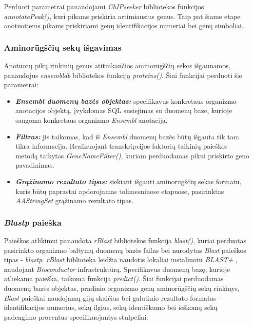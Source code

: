 \documentclass[12pt]{article}
\begin{document}
Perduoti parametrai panaudojami \emph{ChIPseeker} \cite{CHIPSEEKER} bibliotekos
funkcijos \emph{annotatePeak()}, kuri pikams priskiria artimiausius genus.
Taip pat šiame etape anotuotiems pikams priskiriami genų identifikacijos
numeriai bei genų simboliai.

\subsubsection{Aminorūgščių sekų išgavimas}
Anotuotų pikų rinkinių genus atitinkančios aminorūgščių sekos išgaunamos,
panaudojus \emph{ensembldb} \cite{ENSEMBLDB} bibliotekos funkciją 
\emph{proteins()}. Šiai funkcijai perduoti šie parametrai:

\begin{itemize}
    \item \textbf{\emph{Ensembl duomenų bazės objektas:}} specifikavus
        konkretaus organizmo anotacijos objektą, įvykdomas SQL susiejimas su
        duomenų baze, kurioje saugoma konkretaus organizmo \emph{Ensembl}
        anotacija.
    \item \textbf{\emph{Filtras:}} jis taikomas, kad iš \emph{Ensembl} duomenų
        bazės būtų išgauta tik tam tikra informacija. Realizuojant
        transkripcijos faktorių taikinių paieškos metodą taikytas
        \emph{GeneNameFilter()}, kuriam perduodamas pikui priskirto geno
        pavadinimas.
    \item \textbf{\emph{Grąžinamo rezultato tipas:}} siekiant išgauti
        aminorūgščių sekas formatu, kuris būtų paprastai apdorojamas
        tolimesniuose etapuose, pasirinktas \emph{AAStringSet} grąžinamo
        rezultato tipas.
\end{itemize}

\subsubsection{\emph{Blastp} paieška}
Paieškos atlikimui panaudota \emph{rBlast} \cite{RBLAST} bibliotekos funkcija
\emph{blast()}, kuriai perduotas pasirinkto organizmo baltymų duomenų bazės
failas bei nurodytas \emph{Blast} paieškos tipas - \emph{blastp}.
\emph{rBlast} biblioteka leidžia naudotis lokaliai instaliuotu
\emph{BLAST+} \cite{BLAST}, naudojant \emph{Bioconductor} in\-fra\-struk\-tū\-rą.
Specifikavus duomenų bazę, kurioje atliekama paieška, taikoma funkcija
\emph{predict()}. Šiai funkcijai perduodamas duomenų bazės objektas, pradinio
organizmo genų aminorūgščių sekų rinkinys, \emph{Blast} paieškai naudojamų gijų
skaičius bei galutinio rezultato formatas - identifikacijos numerius, sekų
ilgius, sekų identiškumo bei ieškomų sekų padengimo procentus specifikuojantys
stulpeliai.
\end{document}
